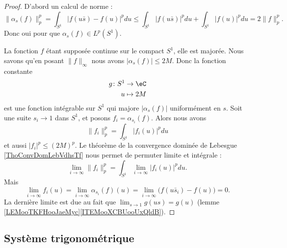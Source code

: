 \begin{proof}
    D'abord un calcul de norme :
    \begin{equation}
        \| \alpha_s(f) \|_p^p=\int_{S^1}| f(u\bar s)-f(u) |^pdu\leq\int_{S^1}| f(u\bar s) |^pdu+\int_{S^1}| f(u) |^pdu=2\| f \|_p^p.
    \end{equation}
    Donc oui pour que \( \alpha_s(f)\in L^p(S^1)\).

    La fonction \( f\) étant supposée continue sur le compact \( S^1\), elle est majorée. Nous savons qu'en posant \( \| f \|_{\infty}\) nous avons \( | \alpha_s(f) |\leq 2M\). Donc la fonction constante
    \begin{equation}
        \begin{aligned}
            g\colon S^1&\to \eC \\
            u&\mapsto 2M 
        \end{aligned}
    \end{equation}
    est une fonction intégrable sur \( S^1\) qui majore \( | \alpha_s(f) |\) uniformément en \( s\). Soit une suite \( s_i\to 1\) dans \( S^1\), et posons \( f_i=\alpha_{s_i}(f)\). Alors nous avons 
    \begin{equation}
        \| f_i \|^p_p=\int_{S^1}| f_i(u) |^pdu
    \end{equation}
    et aussi \( | f_i |^p\leq (2M)^p\). Le théorème de la convergence dominée de Lebesgue \ref{ThoConvDomLebVdhsTf} nous permet de permuter limite et intégrale :
    \begin{equation}
        \lim_{i\to \infty} \| f_i \|_p^p=\int_{S^1}\lim_{i\to \infty} | f_i(u) |^pdu.
    \end{equation}
    Mais
    \begin{equation}
        \lim_{i\to \infty} f_i(u)=\lim_{i\to \infty} \alpha_{s_i}(f)(u)=\lim_{i\to \infty} \big( f(u\bar s_i)-f(u) \big)=0.
    \end{equation}
    La dernière limite est due au fait que \(  \lim_{s\to 1} g(us)=g(u) \) (lemme \ref{LEMooTKFHooJaeMyc}\ref{ITEMooXCBUooUxQldB}).
\end{proof}

\subsection{Système trigonométrique}

